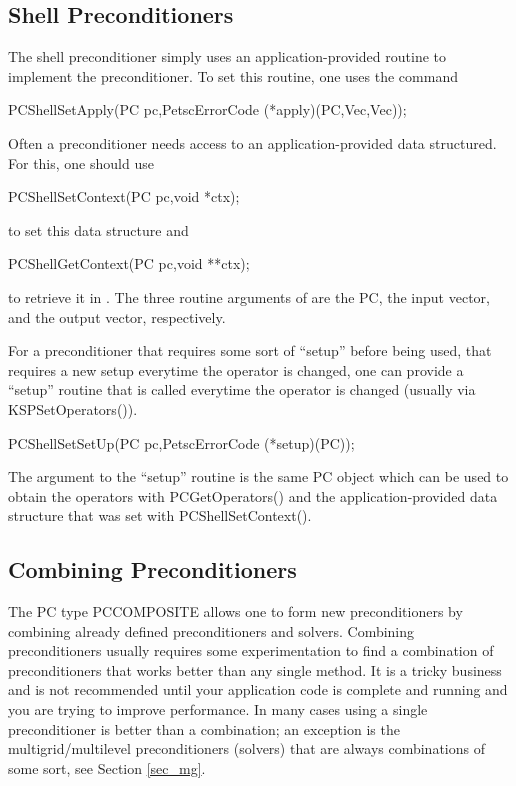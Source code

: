\subsection{Shell Preconditioners}

The shell preconditioner simply uses an application-provided routine to
implement the preconditioner. To set this routine, one uses the
command
\begin{tabbing}
  PCShellSetApply(PC pc,PetscErrorCode (*apply)(PC,Vec,Vec));
\end{tabbing}
Often a preconditioner needs access to an application-provided data
structured.  For this, one should use
\begin{tabbing}
  PCShellSetContext(PC pc,void *ctx);
\end{tabbing}
to set this data structure and
\begin{tabbing}
  PCShellGetContext(PC pc,void **ctx);
\end{tabbing}
to retrieve it in .  The three routine arguments of
 are the PC, the input vector, and the output vector,
respectively.

For a preconditioner that requires some sort of ``setup'' before being used,
that requires a new setup everytime the operator is changed, one can
provide a ``setup'' routine that is called everytime the operator is
changed (usually via KSPSetOperators()).
\begin{tabbing}
  PCShellSetSetUp(PC pc,PetscErrorCode (*setup)(PC));
\end{tabbing}
The argument to the ``setup'' routine is the same PC object which
can be used to obtain the operators with PCGetOperators() and the
application-provided data structure that was set with PCShellSetContext().

\subsection{Combining Preconditioners} 

The PC type PCCOMPOSITE  allows one to form
new preconditioners by combining already defined preconditioners and
solvers. Combining preconditioners usually requires some experimentation
to find a combination of preconditioners that works better than any
single method. It is a tricky business and is not recommended until
your application code is complete and running and you are trying to
improve performance. In many cases using a single preconditioner is better
than a combination; an exception is the multigrid/multilevel preconditioners
(solvers) that are always combinations of some sort, see Section \ref{sec_mg}.

